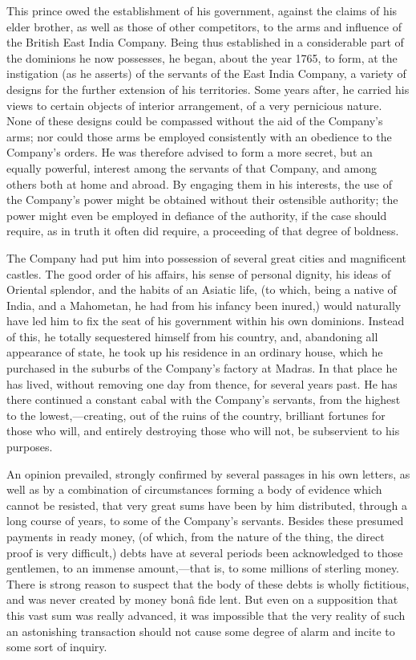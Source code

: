 This prince owed the establishment of his government, against the claims of his elder brother, as well as those of other competitors, to the arms and influence of the British East India Company. Being thus established in a considerable part of the dominions he now possesses, he began, about the year 1765, to form, at the instigation (as he asserts) of the servants of the East India Company, a variety of designs for the further extension of his territories. Some years after, he carried his views to certain objects of interior arrangement, of a very pernicious nature. None of these designs could be compassed without the aid of the Company's arms; nor could those arms be employed consistently with an obedience to the Company's orders. He was therefore advised to form a more secret, but an equally powerful, interest among the servants of that Company, and among others both at home and abroad. By engaging them in his interests, the use of the Company's power might be obtained without their ostensible authority; the power might even be employed in defiance of the authority, if the case should require, as in truth it often did require, a proceeding of that degree of boldness.

The Company had put him into possession of several great cities and magnificent castles. The good order of his affairs, his sense of personal dignity, his ideas of Oriental splendor, and the habits of an Asiatic life, (to which, being a native of India, and a Mahometan, he had from his infancy been inured,) would naturally have led him to fix the seat of his government within his own dominions. Instead of this, he totally sequestered himself from his country, and, abandoning all appearance of state, he took up his residence in an ordinary house, which he purchased in the suburbs of the Company's factory at Madras. In that place he has lived, without removing one day from thence, for several years past. He has there continued a constant cabal with the Company's servants, from the highest to the lowest,—creating, out of the ruins of the country, brilliant fortunes for those who will, and entirely destroying those who will not, be subservient to his purposes.

An opinion prevailed, strongly confirmed by several passages in his own letters, as well as by a combination of circumstances forming a body of evidence which cannot be resisted, that very great sums have been by him distributed, through a long course of years, to some of the Company's servants. Besides these presumed payments in ready money, (of which, from the nature of the thing, the direct proof is very difficult,) debts have at several periods been acknowledged to those gentlemen, to an immense amount,—that is, to some millions of sterling money. There is strong reason to suspect that the body of these debts is wholly fictitious, and was never created by money bonâ fide lent. But even on a supposition that this vast sum was really advanced, it was impossible that the very reality of such an astonishing transaction should not cause some degree of alarm and incite to some sort of inquiry.

